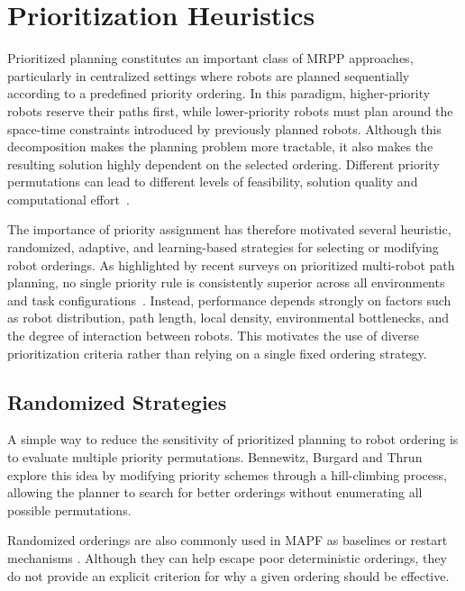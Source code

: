 \section{Prioritization Heuristics}
\label{sec:agent_prioritization}
\hspace{\parindent}
Prioritized planning constitutes an important class of MRPP approaches, particularly in centralized
settings where robots are planned sequentially according to a predefined priority ordering. In this
paradigm, higher-priority robots reserve their paths first, while lower-priority robots must plan
around the space-time constraints introduced by previously planned robots. Although this
decomposition makes the planning problem more tractable, it also makes the resulting solution highly
dependent on the selected ordering. Different priority permutations can lead to different levels of
feasibility, solution quality and computational effort~\cite{ma2019searching,zhang2022learning}.

The importance of priority assignment has therefore motivated several heuristic, randomized,
adaptive, and learning-based strategies for selecting or modifying robot orderings. As highlighted
by recent surveys on prioritized multi-robot path planning, no single priority rule is consistently
superior across all environments and task configurations~\cite{machines2023survey}. Instead,
performance depends strongly on factors such as robot distribution, path length, local density,
environmental bottlenecks, and the degree of interaction between robots. This motivates the use of
diverse prioritization criteria rather than relying on a single fixed ordering strategy.

\subsection{Randomized Strategies}
\hspace{\parindent}
A simple way to reduce the sensitivity of prioritized planning to robot ordering is to evaluate
multiple priority permutations. Bennewitz, Burgard and Thrun~\cite{bennewitz2002finding} explore
this idea by modifying priority schemes through a hill-climbing process, allowing the planner to
search for better orderings without enumerating all possible permutations.

Randomized orderings are also commonly used in MAPF as baselines or restart mechanisms
\cite{ma2019searching,zhang2022learning}. Although they can help escape poor deterministic
orderings, they do not provide an explicit criterion for why a given ordering should be effective.


